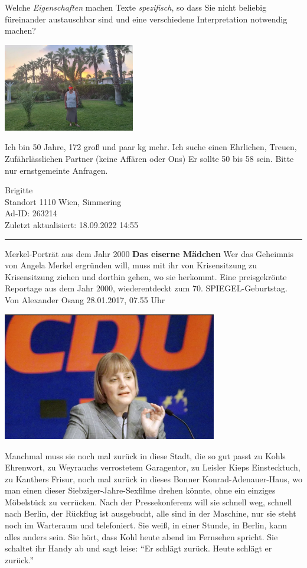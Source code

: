 \documentclass[
  letterpaper,
  DIV=11,
  numbers=noendperiod]{scrreprt}
\begin{document}
Welche \emph{Eigenschaften} machen Texte \emph{spezifisch}, so dass Sie
nicht beliebig füreinander austauschbar sind und eine verschiedene
Interpretation notwendig machen?

\includegraphics[width=2.26in,height=\textheight]{./pictures/partnerschaftsanzeige.png}

Ich bin 50 Jahre, 172 groß und paar kg mehr. Ich suche einen Ehrlichen,
Treuen, Zufährlässlichen Partner (keine Affären oder Ons) Er sollte 50
bis 58 sein. Bitte nur ernstgemeinte Anfragen.

Brigitte\\
Standort 1110 Wien, Simmering\\
Ad-ID: 263214\\
Zuletzt aktualisiert: 18.09.2022 14:55

\begin{center}\rule{0.5\linewidth}{0.5pt}\end{center}

Merkel-Porträt aus dem Jahr 2000 \textbf{Das eiserne Mädchen} Wer das
Geheimnis von Angela Merkel ergründen will, muss mit ihr von
Krisensitzung zu Krisensitzung ziehen und dorthin gehen, wo sie
herkommt. Eine preisgekrönte Reportage aus dem Jahr 2000, wiederentdeckt
zum 70. SPIEGEL-Geburtstag. Von Alexander Osang 28.01.2017, 07.55 Uhr

\includegraphics[width=3.69in,height=\textheight]{./pictures/Angela_Merkel_2000.png}

Manchmal muss sie noch mal zurück in diese Stadt, die so gut passt zu
Kohls Ehrenwort, zu Weyrauchs verrostetem Garagentor, zu Leisler Kieps
Einstecktuch, zu Kanthers Frisur, noch mal zurück in dieses Bonner
Konrad-Adenauer-Haus, wo man einen dieser Siebziger-Jahre-Sexfilme
drehen könnte, ohne ein einziges Möbelstück zu verrücken. Nach der
Pressekonferenz will sie schnell weg, schnell nach Berlin, der Rückflug
ist ausgebucht, alle sind in der Maschine, nur sie steht noch im
Warteraum und telefoniert. Sie weiß, in einer Stunde, in Berlin, kann
alles anders sein. Sie hört, dass Kohl heute abend im Fernsehen spricht.
Sie schaltet ihr Handy ab und sagt leise: ``Er schlägt zurück. Heute
schlägt er zurück.''
\end{document}
